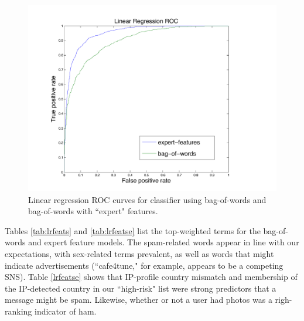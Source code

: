 \documentclass[preprint]{acm_proc_article-sp}
\begin{document}
\begin{figure}[h]
    \centering
    \includegraphics[width=\linewidth]{figures/linear-roc.pdf}
    \caption{Linear regression ROC curves for classifier using bag-of-words and bag-of-words with ``expert" features.}
    \label{fig:roclin}
\end{figure}

Tables \ref{tab:lrfeats} and \ref{tab:lrfeatse} list the top-weighted terms for the bag-of-words and expert feature 
models. The spam-related words appear in line with our expectations, with sex-related terms prevalent, as well as
words that might indicate advertisements (``cafe4tune," for example, appears to be a competing SNS). Table \ref{lrfeatse} 
shows that IP-profile country mismatch and membership of the IP-detected country in our ``high-risk" list were 
strong predictors that a message might be spam. Likewise, whether or not a user had photos was a righ-ranking indicator 
of ham.
\end{document}

